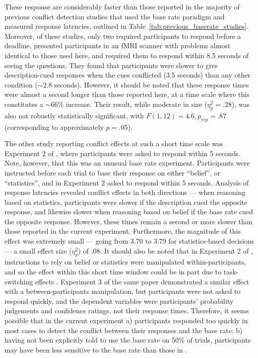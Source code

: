 These response are considerably faster than
those reported in the majority of previous conflict detection studies
that used the base rate paradigm
and measured response latencies, outlined in Table~\ref{tab:previous_baserate_studies}.
Moreover, of these studies, only two required participants to respond before a deadline.
\citet{DeNeys2008} presented participants in an fMRI scanner
with problems almost identical to those used here,
and required them to respond within 8.5 seconds of seeing the questions.
They found that participants were slower to give description-cued responses
when the cues conflicted (3.5 seconds) than any other condition ($\sim$2.8 seconds).
However, it should be noted that these response times were 
almost a second longer than those reported here,
at a time scale where this constitutes a $\sim$66\% increase.
Their result, while moderate in size ($\eta^2_p = .28$),
was also not robustly statistically significant,
with $F(1, 12) = 4.6, p_{rep} = .87$
(corresponding to approximately $p = .05$).

The other study reporting conflict effects at such a short time scale
was Experiment 2 of \citet{Pennycook2014},
where participants were asked to respond within 5 seconds.
Note, however, that this was an unusual base rate experiment.
Participants were instructed before each trial
to base their response on either ``belief'', or ``statistics'',
and in Experiment 2 asked to respond within 5 seconds.
Analysis of response latencies revealed conflict effects in both directions ---
when reasoning based on statistics, participants were slower 
if the description cued the opposite response,
and likewise slower when reasoning based on belief
if the base rate cued the opposite response.
However, these times remain a second or more slower
than those reported in the current experiment.
Furthermore, the magnitude of this effect was extremely small ---
going from 3.70 to 3.79 for statistics-based decisions ---
a small effect size ($\eta^2_p$) of .08.
It should also be noted that in Experiment 2 of \citet{Pennycook2014},
instructions to rely on belief or statistics were manipulated within-participants,
and so the effect within this short time window
could be in part due to task-switching effects \citep{Monsell2003}.
Experiment 3 of the same paper demonstrated
a similar effect with a between-participants manipulation,
but participants were not asked to respond quickly,
and the dependent variables were participants'
probability judgements and confidence ratings,
not their response times.
Therefore, it seems possible that in the current experiment
a) participants responded too quickly in most cases to detect 
the conflict between their responses and the base rate;
b) having not been explicitly told to use the base rate on 50\% of trials,
participants may have been less sensitive to the base rate
than those in  \citet{Pennycook2014}.

